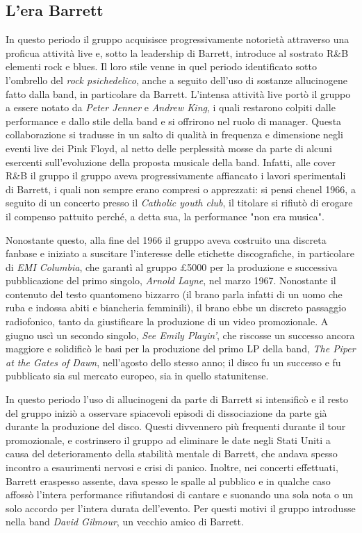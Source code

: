\documentclass[class=book, crop=false, oneside, 12pt]{standalone}
\begin{document}
    \subsection{L'era Barrett}
    In questo periodo il gruppo acquisisce progressivamente notorietà attraverso una proficua attività live e, sotto la leadership di Barrett, introduce al sostrato R\&B elementi rock e blues. Il loro stile venne in quel periodo identificato sotto l'ombrello del \emph{rock psichedelico}, anche a seguito dell'uso di sostanze allucinogene fatto dalla band, in particolare da Barrett. L'intensa attività live portò il gruppo a essere notato da \emph{Peter Jenner} e \emph{Andrew King}, i quali restarono colpiti dalle performance e dallo stile della band e si offrirono nel ruolo di manager. Questa collaborazione si tradusse in un salto di qualità in frequenza e dimensione negli eventi live dei Pink Floyd, al netto delle perplessità mosse da parte di alcuni esercenti sull'evoluzione della proposta musicale della band. Infatti, alle cover R\&B il gruppo  il gruppo aveva progressivamente affiancato i lavori sperimentali di Barrett, i quali non sempre erano compresi o apprezzati: si pensi chenel 1966, a seguito di un concerto presso il \emph{Catholic youth club}, il titolare si rifiutò di erogare il compenso pattuito perché, a detta sua, la performance "non era musica". 
    
    Nonostante questo, alla fine del 1966 il gruppo aveva costruito una discreta fanbase e iniziato a suscitare l'interesse delle etichette discografiche, in particolare di \emph{EMI Columbia}, che garantì al gruppo \pounds 5000 per la produzione e successiva pubblicazione del primo singolo, \emph{Arnold Layne}, nel marzo 1967. Nonostante il contenuto del testo quantomeno bizzarro (il brano parla infatti di un uomo che ruba e indossa abiti e biancheria femminili), il brano ebbe un discreto passaggio radiofonico, tanto da giustificare la produzione di un video promozionale. A giugno uscì un secondo singolo, \emph{See  Emily Playin'}, che riscosse un successo ancora maggiore e solidificò le basi per la produzione del primo LP della band, \emph{The Piper at the Gates of Dawn}, nell'agosto dello stesso anno; il disco fu un successo e fu pubblicato sia sul mercato europeo, sia in quello statunitense. 
    
    In questo periodo l'uso di allucinogeni da parte di Barrett si intensificò e il resto del gruppo iniziò a osservare spiacevoli episodi di dissociazione da parte già durante la produzione del disco. Questi divvennero più frequenti durante il tour promozionale, e costrinsero il gruppo ad eliminare le date negli Stati Uniti a causa del deterioramento della stabilità mentale di Barrett, che andava spesso incontro a esaurimenti nervosi e crisi di panico. Inoltre, nei concerti effettuati, Barrett eraspesso assente, dava spesso le spalle al pubblico e in qualche caso affossò l'intera performance rifiutandosi di cantare e suonando una sola nota o un solo accordo per l'intera durata dell'evento. Per questi motivi il gruppo introdusse nella band \emph{David Gilmour}, un vecchio amico di Barrett. 
    
\end{document}
